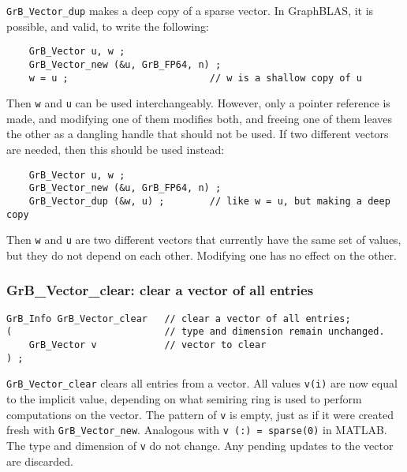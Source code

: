 \documentclass[12pt]{article}
\begin{document}
{\verb'GrB_Vector_dup' makes a deep copy of a sparse vector.
In GraphBLAS, it is possible, and valid, to write the following:

    {\footnotesize
    \begin{verbatim}
    GrB_Vector u, w ;
    GrB_Vector_new (&u, GrB_FP64, n) ;
    w = u ;                         // w is a shallow copy of u  \end{verbatim}}

Then \verb'w' and \verb'u' can be used interchangeably.  However, only a pointer
reference is made, and modifying one of them modifies both, and freeing one of
them leaves the other as a dangling handle that should not be used.
If two different vectors are needed, then this should be used instead:

    {\footnotesize
    \begin{verbatim}
    GrB_Vector u, w ;
    GrB_Vector_new (&u, GrB_FP64, n) ;
    GrB_Vector_dup (&w, u) ;        // like w = u, but making a deep copy \end{verbatim}}

Then \verb'w' and \verb'u' are two different vectors that currently have the
same set of values, but they do not depend on each other.  Modifying one has
no effect on the other.

\subsubsection{{\sf GrB\_Vector\_clear:}         clear a vector of all entries}
\label{vector_clear}

\begin{mdframed}[userdefinedwidth=6in]
{\footnotesize
\begin{verbatim}
GrB_Info GrB_Vector_clear   // clear a vector of all entries;
(                           // type and dimension remain unchanged.
    GrB_Vector v            // vector to clear
) ;
\end{verbatim}
} \end{mdframed}

\verb'GrB_Vector_clear' clears all entries from a vector.  All values
\verb'v(i)' are now equal to the implicit value, depending on what semiring
ring is used to perform computations on the vector.  The pattern of \verb'v' is
empty, just as if it were created fresh with \verb'GrB_Vector_new'.  Analogous
with \verb'v (:) = sparse(0)' in MATLAB.  The type and dimension of \verb'v' do
not change.  Any pending updates to the vector are discarded.

}
\end{document}
